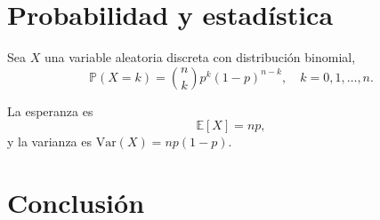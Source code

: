 \documentclass[a5paper,DIV=12,11pt]{scrbook}
\begin{document}
    \section{Probabilidad y estadística}
    Sea $X$ una variable aleatoria discreta con distribución binomial,
    \[
    \mathbb{P}(X = k) = \binom{n}{k} p^k (1-p)^{n-k}, \quad k=0,1,\dots,n.
    \]

    La esperanza es
    \begin{equation}
    \mathbb{E}[X] = np,
    \end{equation}
    y la varianza es $\mathrm{Var}(X) = np(1-p)$.

    \lipsum[11-12]

    \section{Conclusión}
    \lipsum[13-14]

\end{document}
